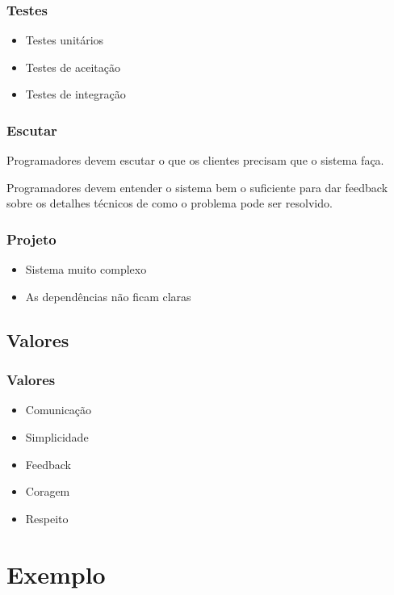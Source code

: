 \documentclass[10pt]{beamer}
\begin{document}
\begin{frame}
  \frametitle{Testes}
  \begin{itemize}
  \item Testes unitários
  \item Testes de aceitação
  \item Testes de integração
  \end{itemize}
\end{frame}

\begin{frame}
  \frametitle{Escutar}
  Programadores devem escutar o que os clientes precisam que o sistema faça.

  \pause
  Programadores devem entender o sistema bem o suficiente para dar feedback
  sobre os detalhes técnicos de como o problema pode ser resolvido.
\end{frame}

\begin{frame}
  \frametitle{Projeto}
  \begin{itemize}
  \item Sistema muito complexo
  \item As dependências não ficam claras
  \end{itemize}
\end{frame}

\subsection{Valores}
\begin{frame}
  \frametitle{Valores}
  \begin{itemize}
  \item Comunicação
  \item Simplicidade
  \item Feedback
  \item Coragem
  \item Respeito
  \end{itemize}
\end{frame}

\section{Exemplo}

\begin{frame}%
  \frametitle{}
  \begin{figure}
    \centering
  \end{figure}
\end{frame}
\end{document}
